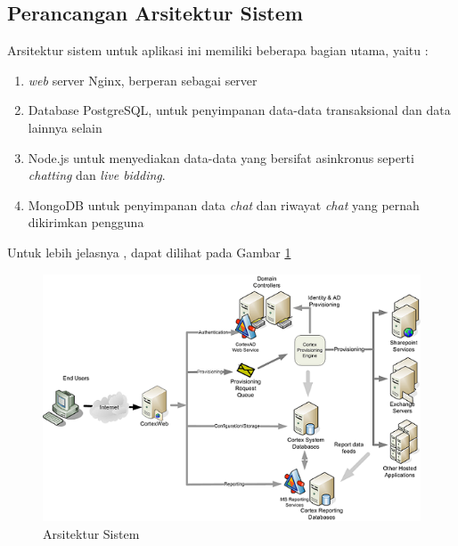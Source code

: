   \subsection{Perancangan Arsitektur Sistem}
	Arsitektur sistem untuk aplikasi ini memiliki beberapa bagian utama, yaitu :
    \
\begin{enumerate}
\item \textit{web} server Nginx, berperan sebagai server
\item Database PostgreSQL, untuk penyimpanan data-data transaksional dan data lainnya selain 
\item Node.js untuk menyediakan data-data yang bersifat asinkronus seperti \textit{chatting} dan \textit{live bidding}.
\item MongoDB untuk penyimpanan data \textit{chat} dan riwayat \textit{chat} yang pernah dikirimkan pengguna
\end{enumerate}
	Untuk lebih jelasnya , dapat dilihat pada Gambar \ref{sysarch}
      \begin{figure}[H]
        \centering
        \includegraphics[width=\linewidth]{images/bab3/system-architecture.jpg}
        \caption{Arsitektur Sistem}
        \label{sysarch}
      \end{figure}
